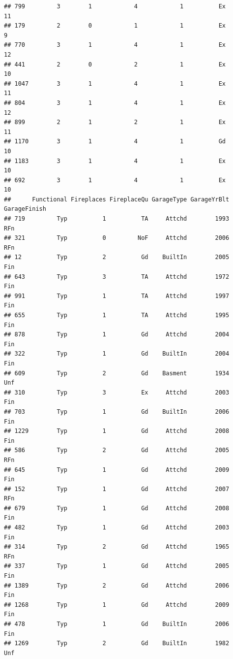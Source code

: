 \documentclass[]{article}
\begin{document}
\begin{verbatim}
## 799         3        1            4            1          Ex           11
## 179         2        0            1            1          Ex            9
## 770         3        1            4            1          Ex           12
## 441         2        0            2            1          Ex           10
## 1047        3        1            4            1          Ex           11
## 804         3        1            4            1          Ex           12
## 899         2        1            2            1          Ex           11
## 1170        3        1            4            1          Gd           10
## 1183        3        1            4            1          Ex           10
## 692         3        1            4            1          Ex           10
##      Functional Fireplaces FireplaceQu GarageType GarageYrBlt GarageFinish
## 719         Typ          1          TA     Attchd        1993          RFn
## 321         Typ          0         NoF     Attchd        2006          RFn
## 12          Typ          2          Gd    BuiltIn        2005          Fin
## 643         Typ          3          TA     Attchd        1972          Fin
## 991         Typ          1          TA     Attchd        1997          Fin
## 655         Typ          1          TA     Attchd        1995          Fin
## 878         Typ          1          Gd     Attchd        2004          Fin
## 322         Typ          1          Gd    BuiltIn        2004          Fin
## 609         Typ          2          Gd    Basment        1934          Unf
## 310         Typ          3          Ex     Attchd        2003          Fin
## 703         Typ          1          Gd    BuiltIn        2006          Fin
## 1229        Typ          1          Gd     Attchd        2008          Fin
## 586         Typ          2          Gd     Attchd        2005          RFn
## 645         Typ          1          Gd     Attchd        2009          Fin
## 152         Typ          1          Gd     Attchd        2007          RFn
## 679         Typ          1          Gd     Attchd        2008          Fin
## 482         Typ          1          Gd     Attchd        2003          Fin
## 314         Typ          2          Gd     Attchd        1965          RFn
## 337         Typ          1          Gd     Attchd        2005          Fin
## 1389        Typ          2          Gd     Attchd        2006          Fin
## 1268        Typ          1          Gd     Attchd        2009          Fin
## 478         Typ          1          Gd    BuiltIn        2006          Fin
## 1269        Typ          2          Gd    BuiltIn        1982          Unf

\end{verbatim}
\end{document}
